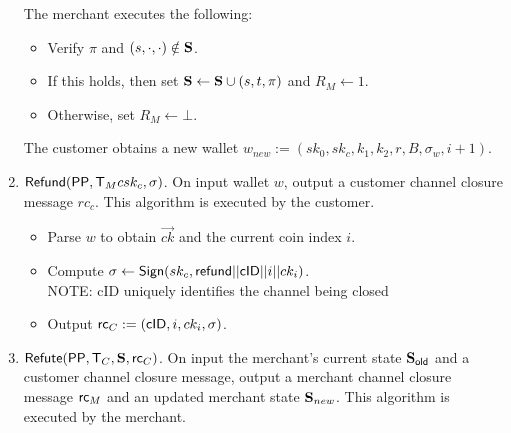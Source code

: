 \documentclass[11pt]{report}
\begin{document}
\begin{enumerate}
\medskip \noindent
The merchant executes the following:
\begin{itemize}
\item Verify $\pi$ and $(s,\cdot, \cdot) \notin {\bf S}$.
\item If this holds, then set ${\bf S} \leftarrow {\bf S}  \cup (s, t, \pi)$ and $R_{M} \leftarrow 1$.
\item Otherwise, set $R_{M} \leftarrow \bot$.
\end{itemize}

\medskip \noindent
The customer obtains a new wallet $w_{new} := (sk_0, sk_c, k_1, k_2, r, B, \sigma_w, i+1)$.

\item ${\sf Refund}({\sf PP}, {\sf T}_{M} csk_c, \sigma)$. On input wallet $w$, output a customer channel closure message $rc_c$. This algorithm is executed by the customer.
\begin{itemize}
\item Parse $w$ to obtain $\vec{ck}$ and the current coin index $i$.
\item Compute $\sigma \leftarrow {\sf Sign}(sk_c, {\sf refund}||{\sf cID}||i||ck_i)$.
\\	NOTE: {\sf cID} uniquely identifies the channel being closed
\item Output ${\sf rc}_{C} := ({\sf cID}, i, ck_i, \sigma)$.
\end{itemize}

\item ${\sf Refute}({\sf PP}, {\sf T}_{C}, {\bf S}, {\sf rc}_{C})$. On input the merchant's current state ${\bf S}_{\sf old}$ and a customer channel closure message, output a merchant channel closure message ${\sf rc}_{M}$ and an updated merchant state ${\bf S}_{new}$. This algorithm is executed by the merchant.


\end{enumerate}
\end{document}
